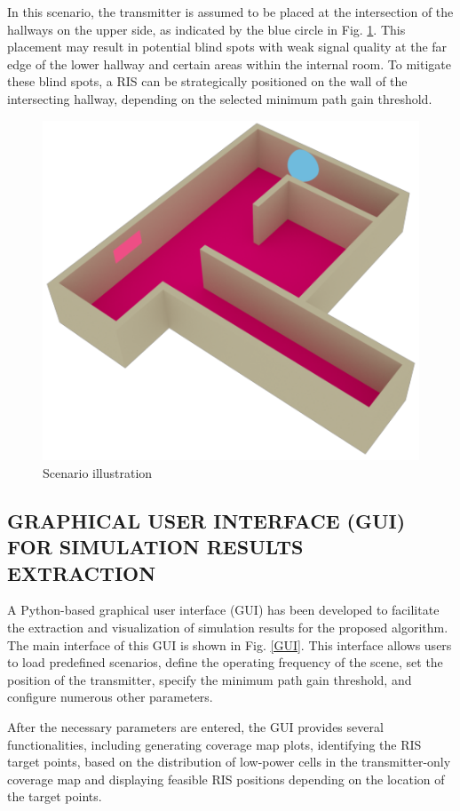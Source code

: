 \documentclass{IEEEoj}
\begin{document}
In this scenario, the transmitter is assumed to be placed at the intersection of the hallways on the upper side, as indicated by the blue circle in Fig. \ref{Scenario}. This placement may result in potential blind spots with weak signal quality at the far edge of the lower hallway and certain areas within the internal room. To mitigate these blind spots, a RIS can be strategically positioned on the wall of the intersecting hallway, depending on the selected minimum path gain threshold.

\begin{figure}
	\centering \includegraphics[width=.8\linewidth]{Sim_Results/Scenario_Illustration.png}
	\caption{Scenario illustration}
	\label{Scenario}
\end{figure}

\subsection{GRAPHICAL USER INTERFACE (GUI) FOR SIMULATION RESULTS EXTRACTION}
A Python-based graphical user interface (GUI) has been developed to facilitate the extraction and visualization of simulation results for the proposed algorithm. The main interface of this GUI is shown in Fig. \ref{GUI}. This interface allows users to load predefined scenarios, define the operating frequency of the scene, set the position of the transmitter, specify the minimum path gain threshold, and configure numerous other parameters.

After the necessary parameters are entered, the GUI provides several functionalities, including generating coverage map plots, identifying the RIS target points, based on the distribution of low-power cells in the transmitter-only coverage map and displaying feasible RIS positions depending on the location of the target points.
\end{document}
